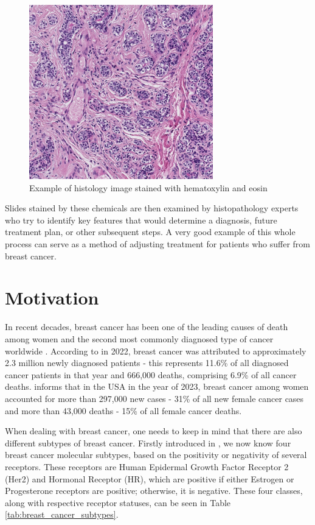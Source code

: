 \begin{figure}[h]
\begin{centering}
\includegraphics[width=8cm]{assets/images/histology_image_example.png}
\par\end{centering}
\caption{Example of histology image stained with hematoxylin and eosin \label{fig:h&e-image}}
\end{figure}

Slides stained by these chemicals are then examined by histopathology experts who try to identify key features that would determine a diagnosis, future treatment plan, or other subsequent steps. A very good example of this whole process can serve as a method of adjusting treatment for patients who suffer from breast cancer.

\section{Motivation}

In recent decades, breast cancer has been one of the leading causes of death among women and the second most commonly diagnosed type of cancer worldwide \cite{Bray2024, Siegel2023}. According to \cite{Bray2024} in 2022, breast cancer was attributed to approximately 2.3 million newly diagnosed patients - this represents 11.6\% of all diagnosed cancer patients in that year and 666,000 deaths, comprising 6.9\% of all cancer deaths. \cite{Siegel2023} informs that in the USA in the year of 2023, breast cancer among women accounted for more than 297,000 new cases - 31\% of all new female cancer cases and more than 43,000 deaths - 15\% of all female cancer deaths.

When dealing with breast cancer, one needs to keep in mind that there are also different subtypes of breast cancer. Firstly introduced in \cite{Perou2000}, we now know four breast cancer molecular subtypes, based on the positivity or negativity of several receptors. These receptors are Human Epidermal Growth Factor Receptor 2 (Her2) and Hormonal Receptor (HR), which are positive if either Estrogen or Progesterone receptors are positive; otherwise, it is negative. These four classes, along with respective receptor statuses, can be seen in Table \ref{tab:breast_cancer_subtypes}.


